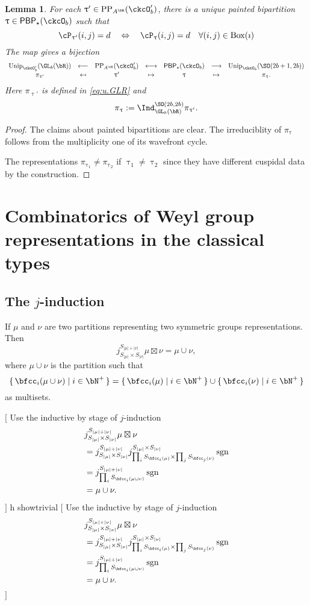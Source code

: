 \documentclass[12pt,a4paper]{amsart}
\newcommand{\trivial}[2][]{\if\relax\detokenize{#1}\relax
  {%
      \color{orange} \vspace{0em} $[$  #2 $]$
      \color{black}
  }
  \else
\ifx#1h
\ifcsname showtrivial\endcsname
{%
    \color{orange} \vspace{0em}  $[$ #2 $]$
    \color{black}
}
\fi
\else {\red Wrong argument!} \fi
\fi
}
\def\abs#1{\left|{#1}\right|}
\newcommand{\sgn}{\operatorname{sgn}}
\numberwithin{equation}{section}
\newtheorem{lem}[thm]{Lemma}
\theoremstyle{remark}
\def\Unip{\mathrm{Unip}}
\def\PP{\mathrm{PP}}
\def\BOX#1{\mathrm{Box}(#1)}
\providecommand\mapsfrom{\scalebox{-1}[1]{$\mapsto$}}
\def\PBP{\mathsf{PBP}}
\begin{document}
\begin{lem}
  For each $\uptau' \in \PP_{A^{\bR}}(\ckcO'_{b})$, there is a unique painted
  bipartition $\uptau\in \PBP_{\star}(\ckcO_{b})$ such that
  \[
    \cP_{\uptau'}(i,j) = d \quad %
    \Leftrightarrow
    \quad
    \cP_{\uptau}(i,j) = d \quad \forall (i,j)\in \BOX{\imath}\\
  \]
  The map gives a bijection
  \[
    \begin{array}{ccccccc}
      \Unip_{\ckcO'_{b}}(\GL_{b}(\bR))&\longleftarrow
      &\PP_{A^{\bR}}(\ckcO'_{b}) & \longleftrightarrow
      & \PBP_{\star}(\ckcO_{b}) & \longrightarrow
      & \Unip_{\ckcO_{b}}(\SO(2b+1,2b))\\
      \pi_{\uptau'} & \mapsfrom & \uptau' & \mapsto
      & \uptau & \mapsto & \pi_{\uptau}.
    \end{array}
  \]
  Here $\pi_{\uptau'}$ is defined in \eqref{eq:u.GLR} and
  \[
    \pi_{\uptau} := \Ind_{\GL_{b}(\bR)}^{\SO(2b,2b)} \pi_{\uptau'}.
  \]
\end{lem}
\begin{proof}
  The claims about painted bipartitions are clear.
  The irreduciblity of $\pi_{\uptau}$ follows from the multiplicity one
  of its wavefront cycle.

  The representations $\pi_{\uptau_{1}}\neq \pi_{\uptau_{2}}$ if
  $\uptau_{1}\neq \uptau_{2}$ since they have different cuspidal data by the
  construction.
\end{proof}


\appendix
\section{Combinatorics of Weyl group representations in the classical types}

\subsection{The $j$-induction}
If $\mu$ and $\nu$ are two partitions representing two symmetric groups
representations.
Then
\[
  j_{S_{\abs{\mu}}\times S_{\abs{\nu}}}^{S_{\abs{\mu}+\abs{\nu}}}
  \mu\boxtimes \nu
  = \mu\cup \nu,
\]
where $\mu\cup \nu$ is the partition such that
\[
  \set{\bfcc_{i}(\mu\cup\nu) | i\in \bN^{+}} =
  \set{\bfcc_{i}(\mu) | i\in \bN^{+}}
  \cup
  \set{\bfcc_{i}(\nu) | i\in \bN^{+}}
\]
as multisets.

\trivial{
Use the inductive by stage of $j$-induction
\[
  \begin{split}
  &j_{S_{\abs{\mu}}\times S_{\abs{\nu}}}^{S_{\abs{\mu}+\abs{\nu}}}
  \mu\boxtimes \nu\\
  &=
j_{S_{\abs{\mu}}\times S_{\abs{\nu}}}^{S_{\abs{\mu}+\abs{\nu}}}
j^{S_{\abs{\mu}}\times S_{\abs{\nu}}}_{\prod_{i}S_{\bfcc_{i}(\mu)}\times
  \prod_{j} S_{\bfcc_{j}(\nu)}}\sgn\\
 &=
j^{S_{\abs{\mu}+\abs{\nu}}}_{\prod_{i}S_{\bfcc_{i}(\mu\cup \nu)}}\sgn\\
  &= \mu\cup \nu.
  \end{split}
\]
}
\end{document}
